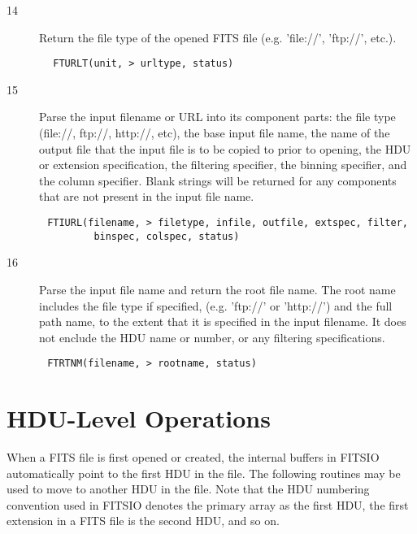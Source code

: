 \documentclass[11pt]{book}
\begin{document}
\begin{description}
\item[14] Return the file type of the opened FITS file (e.g. 'file://', 'ftp://',
  etc.).
\end{description}

\begin{verbatim}
        FTURLT(unit, > urltype, status)
\end{verbatim}

\begin{description}
\item[15]  Parse the input filename or URL into its component parts: the file
type (file://, ftp://, http://, etc), the base input file name, the
name of the output file that the input file is to be copied to prior
to opening, the HDU or extension specification, the filtering
specifier, the binning specifier, and the column specifier.  Blank
strings will be returned for any components that are not present
in the input file name.
\end{description}

\begin{verbatim}
       FTIURL(filename, > filetype, infile, outfile, extspec, filter,
               binspec, colspec, status)
\end{verbatim}

\begin{description}
\item[16] Parse the input file name and return the root file name.  The root
name includes the file type if specified, (e.g.  'ftp://' or 'http://')
and the full path name, to the extent that it is specified in the input
filename.  It does not enclude the HDU name or number, or any filtering
specifications.
\end{description}

\begin{verbatim}
       FTRTNM(filename, > rootname, status)
\end{verbatim}


\section{HDU-Level Operations \label{FTMAHD}}

When a FITS file is first opened or created, the internal buffers in
FITSIO automatically point to the first HDU in the file.  The following
routines may be used to move to another HDU in the file.  Note that
the HDU numbering convention used in FITSIO  denotes the primary array
as the first HDU, the first extension in a FITS file is the second HDU,
and so on.
\end{document}
